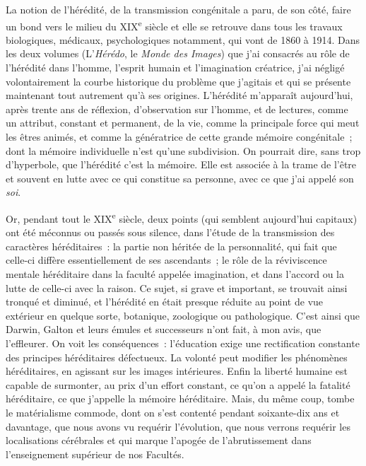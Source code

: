 \documentclass[french,twoside]{book} %
\begin{document}
La notion de l’hérédité, de la transmission congénitale a paru, de son côté, faire un bond vers le milieu du XIX\textsuperscript{e} siècle et elle se retrouve dans tous les travaux biologiques, médicaux, psychologiques notamment, qui vont de 1860 à 1914. Dans les deux volumes (L’{\itshape Hérédo}, le {\itshape Monde des Images}) que j’ai consacrés au rôle de l’hérédité dans l’homme, l’esprit humain et l’imagination créatrice, j’ai négligé volontairement la courbe historique du problème que j’agitais et qui se présente maintenant tout autrement qu’à ses origines. L’hérédité m’apparaît aujourd’hui, après trente ans de réflexion, d’observation sur l’homme, et de lectures, comme un attribut, constant et permanent, de la vie, comme la principale force qui meut les êtres animés, et comme la génératrice de cette grande mémoire congénitale ; dont la mémoire individuelle n’est qu’une subdivision. On pourrait dire, sans trop d’hyperbole, que l’hérédité c’est la mémoire. Elle est associée à la trame de l’être et souvent en lutte avec ce qui constitue sa personne, avec ce que j’ai appelé son {\itshape soi}.\par
Or, pendant tout le XIX\textsuperscript{e} siècle, deux points (qui semblent aujourd’hui capitaux) ont été méconnus ou passés sous silence, dans l’étude de la transmission des caractères héréditaires : la partie non héritée de la personnalité, qui fait que celle-ci diffère essentiellement de ses ascendants ; le rôle de la réviviscence mentale héréditaire dans la faculté appelée imagination, et dans l’accord ou la lutte de celle-ci avec la raison. Ce sujet, si grave et important, se trouvait ainsi tronqué et diminué, et l’hérédité en était presque réduite au point de vue extérieur en quelque sorte, botanique, zoologique ou pathologique. C’est ainsi que Darwin, Galton et leurs émules et successeurs n’ont fait, à mon avis, que l’effleurer. On voit les conséquences : l’éducation exige une rectification constante des principes héréditaires défectueux. La volonté peut modifier les phénomènes héréditaires, en agissant sur les images intérieures. Enfin la liberté humaine est capable de surmonter, au prix d’un effort constant, ce qu’on a appelé la fatalité héréditaire, ce que j’appelle la mémoire héréditaire. Mais, du même coup, tombe le matérialisme commode, dont on s’est contenté pendant soixante-dix ans et davantage, que nous avons vu requérir l’évolution, que nous verrons requérir les localisations cérébrales et qui marque l’apogée de l’abrutissement dans l’enseignement supérieur de nos Facultés.\par
\end{document}
